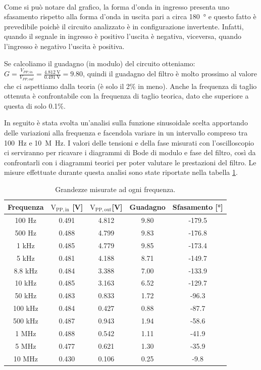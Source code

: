 \documentclass{report}
\begin{document}
\\Come si può notare dal grafico, la forma d'onda in ingresso presenta uno sfasamento rispetto alla forma d'onda in uscita pari a circa \SI{180}{\degree} e questo fatto è prevedibile poichè il circuito analizzato è in configurazione invertente. Infatti, quando il segnale in ingresso è positivo l'uscita è negativa, viceversa, quando l'ingresso è negativo l'uscita è positiva.\par %
Se calcoliamo il guadagno (in modulo) del circuito otteniamo: $\displaystyle{G=\frac{V_{PP,in}}{V_{PP,out}}=\frac{\SI{4.812}{\volt}}{\SI{0.491}{\volt}}=9.80}$, quindi il guadagno del filtro è molto prossimo al valore che ci aspettiamo dalla teoria (è solo il 2\% in meno). Anche la frequenza di taglio ottenuta è confrontabile con la frequenza di taglio teorica, dato che superiore a questa di solo 0.1\%.\par %
In seguito è stata svolta un'analisi sulla funzione sinusoidale scelta apportando delle variazioni alla frequenza e facendola variare in un intervallo compreso tra \SI{100}{\hertz} e \SI{10}{M\hertz}. I valori delle tensioni e della fase misurati con l'oscilloscopio ci serviranno per ricavare i diagrammi di Bode di modulo e fase del filtro, così da confrontarli con i diagrammi teorici per poter valutare le prestazioni del filtro. Le misure effettuate durante questa analisi sono state riportate nella tabella \ref{table:misure}. %
\begin{table}[h!]
	\centering
	\begin{tabular}{|c|c|c|c|c|}
		\hline
		\textbf{Frequenza} &\boldmath$\displaystyle\mathrm{{V_{PP,in}}}$ \textbf{[V]} & \boldmath$\displaystyle\mathrm{{V_{PP,out}}}$\textbf{[V]} & \textbf{Guadagno} & \textbf{Sfasamento [°]}\\
		\hline
		100 Hz & 0.491 & 4.812 & 9.80 & -179.5\\
		\hline
		500 Hz & 0.488 & 4.799 & 9.83 & -176.8\\
		\hline
		1 kHz & 0.485 & 4.779 & 9.85 & -173.4\\
		\hline
		5 kHz & 0.481 & 4.188 & 8.71 & -149.7\\
		\hline
		8.8 kHz & 0.484 & 3.388 & 7.00 & -133.9\\
		\hline
		10 kHz & 0.485 & 3.163 & 6.52 & -129.7\\
		\hline
		50 kHz & 0.483 & 0.833 & 1.72 & -96.3\\
		\hline
		100 kHz & 0.484 & 0.427 & 0.88 & -87.7\\
		\hline
		500 kHz & 0.487 & 0.943 & 1.94 & -58.6\\
		\hline
		1 MHz & 0.488 & 0.542 & 1.11 & -41.9\\
		\hline
		5 MHz & 0.477 & 0.621 & 1.30 & -35.9\\
		\hline
		10 MHz & 0.430 & 0.106 & 0.25 & -9.8\\
		\hline\end{tabular}
\caption{Grandezze misurate ad ogni frequenza.}
\label{table:misure}
\end{table}
\end{document}
